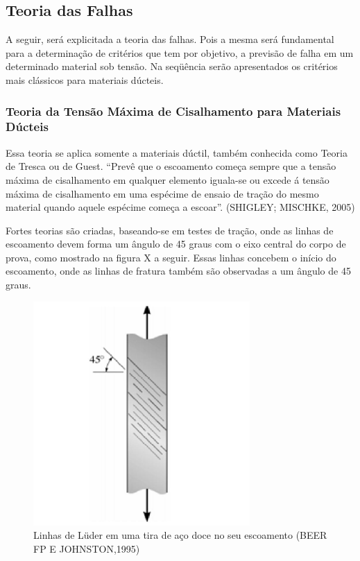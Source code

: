\subsection{Teoria das Falhas}

A seguir, será explicitada a teoria das falhas. Pois a mesma será fundamental para a determinação de critérios que tem por objetivo, a previsão de falha em um determinado material sob tensão. Na seqüência serão apresentados os critérios mais clássicos para materiais dúcteis.

\subsubsection{Teoria da Tensão Máxima de Cisalhamento para Materiais Dúcteis}

Essa teoria se aplica somente a materiais dúctil, também conhecida como Teoria de Tresca ou de Guest. “Prevê que o escoamento começa sempre que a tensão máxima de cisalhamento em qualquer elemento iguala-se ou excede á tensão máxima de cisalhamento em uma espécime de ensaio de tração do mesmo material quando aquele espécime começa a escoar”. (SHIGLEY; MISCHKE, 2005)

Fortes teorias são criadas, baseando-se em testes de tração, onde as linhas de escoamento devem forma um ângulo de 45 graus com o eixo central do corpo de prova, como mostrado na figura X a seguir. Essas linhas concebem o início do escoamento, onde as linhas de fratura também são observadas a um ângulo de 45 graus.

\begin{figure}[h]
\centering
\includegraphics[scale=0.8]{figuras/linhas45.png}
\caption{Linhas de Lüder em uma tira de aço doce no seu escoamento (BEER FP E JOHNSTON,1995) }
\end{figure}

